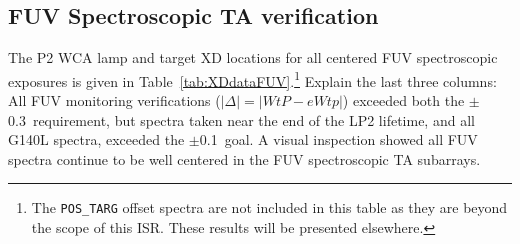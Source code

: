 \subsection{FUV Spectroscopic TA verification}\label{subsec:FspVER}
The P2 WCA lamp and target XD locations for all centered FUV spectroscopic exposures is given in Table~\ref{tab:XDdataFUV}.\footnote{The \texttt{POS\_TARG} offset spectra are not included in this table as
they are beyond the scope of this ISR. These results will be presented elsewhere.}
Explain the last three columns:
All FUV monitoring verifications ($|\Delta| = |WtP-eWtp|$) exceeded both the $\pm$0.3\arcsec\ requirement,
but spectra taken near the end of the LP2 lifetime, and all G140L spectra, exceeded the $\pm$0.1\arcsec\ goal.
A visual inspection showed all FUV spectra continue to be well centered in the FUV spectroscopic TA subarrays.
